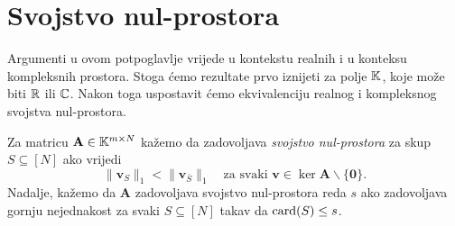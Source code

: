\documentclass[a4paper,twoside,12pt]{memoir} %
\newcommand{\vect}[1]{\mathbf{#1}}
\renewcommand{\vec}{\vect}
\newcommand{\card}{\text{\normalfont{card}}}
\newcommand{\norm}[1]{\|{#1}\|}
\begin{document}
\section[Svojstvo nul-prostora][Svojstvo nul-prostora]{Svojstvo nul-prostora}
Argumenti u ovom potpoglavlje vrijede u kontekstu realnih i u konteksu kompleksnih prostora. Stoga \'cemo rezultate prvo iznijeti za polje $\mathbb{K}$, koje mo\v{z}e biti $\mathbb{R}$ ili $\mathbb{C}$. Nakon toga uspostavit \'cemo ekvivalenciju realnog i kompleksnog svojstva nul-prostora.

\begin{defn}
    Za matricu $\vec A \in \K^{m \times N}$ ka\v{z}emo da zadovoljava \textit{svojstvo nul-prostora} za skup $S \subseteq [N]$ ako vrijedi
    \begin{equation}\label{svojstvo_nul_prostora}
        \norm{\vec v_S}_1 < \norm{\vec v_{\bar{S}}}_1  \quad \text{za svaki }\vec v \in \ker \vec A \backslash \{\vec 0\}.
    \end{equation}
    Nadalje, ka\v{z}emo da $\vec A$ zadovoljava svojstvo nul-prostora reda $s$ ako zadovoljava gornju nejednakost za svaki $S \subseteq [N]$ takav da $\card(S) \leq s$.
\end{defn}
\end{document}
